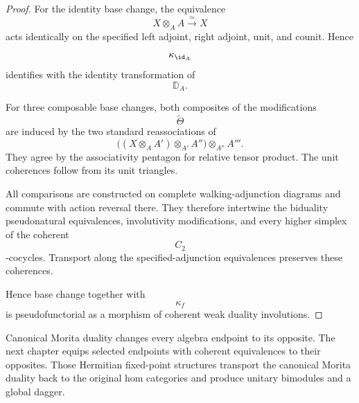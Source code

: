 \begin{proof}
For the identity base change, the equivalence
\[
    X\otimes_A A
    \xrightarrow{\;\simeq\;}
    X
\]
acts identically on the specified left adjoint, right adjoint, unit, and
counit. Hence
\[
    \kappa_{\id_A}
\]
identifies with the identity transformation of
\[
    \mathbb D_A.
\]

For three composable base changes, both composites of the modifications
\[
    \widetilde\Theta
\]
are induced by the two standard reassociations of
\[
    \bigl(
        (X\otimes_A A')
        \otimes_{A'}A''
    \bigr)
    \otimes_{A''}A'''.
\]
They agree by the associativity pentagon for relative tensor product.
The unit coherences follow from its unit triangles.

All comparisons are constructed on complete walking-adjunction diagrams
and commute with action reversal there. They therefore intertwine the
biduality pseudonatural equivalences, involutivity modifications, and
every higher simplex of the coherent
\[
    C_2
\]
-cocycles. Transport along the specified-adjunction equivalences
preserves these coherences.

Hence base change together with
\[
    \kappa_f
\]
is pseudofunctorial as a morphism of coherent weak duality involutions.
\end{proof}

Canonical Morita duality changes every algebra endpoint to its opposite.
The next chapter equips selected endpoints with coherent equivalences to
their opposites. Those Hermitian fixed-point structures transport the
canonical Morita duality back to the original hom categories and produce
unitary bimodules and a global dagger.